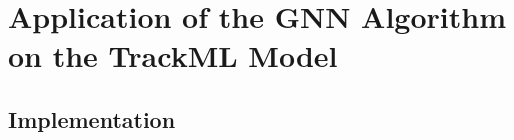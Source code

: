 





\chapter{Application of the GNN Algorithm on the TrackML Model}
\label{chapter-6}




\section{Implementation}



